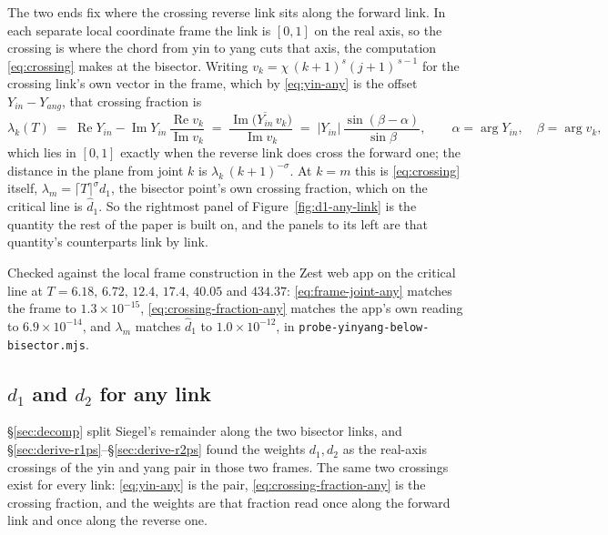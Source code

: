\documentclass[11pt]{article}
\theoremstyle{definition}
\begin{document}
The two ends fix where the crossing reverse link sits along the forward link. In each separate local coordinate frame the link
is $[0,1]$ on the real axis, so the crossing is where the chord from yin to
yang cuts that axis, the computation \eqref{eq:crossing} makes at the bisector.
Writing $v_k=\chi\,(k+1)^{s}(j+1)^{\,s-1}$ for the crossing link's own vector in
the frame, which by \eqref{eq:yin-any} is the offset $Y_{in}-Y_{ang}$, that
crossing fraction is
\begin{equation}\label{eq:crossing-fraction-any}
\lambda_k(T)
\;=\;\operatorname{Re}Y_{in}-\operatorname{Im}Y_{in}\,
\frac{\operatorname{Re}v_k}{\operatorname{Im}v_k}
\;=\;\frac{\operatorname{Im}\bigl(\overline{Y_{in}}\,v_k\bigr)}{\operatorname{Im}v_k}
\;=\;\bigl|Y_{in}\bigr|\,\frac{\sin(\beta-\alpha)}{\sin\beta},
\qquad
\alpha=\arg Y_{in},\quad \beta=\arg v_k,
\end{equation}
which lies in $[0,1]$ exactly when the reverse link does cross the forward one;
the distance in the plane from joint $k$ is $\lambda_k\,(k+1)^{-\sigma}$. At
$k=m$ this is \eqref{eq:crossing} itself, $\lambda_m=\lceil T\rceil^{\sigma}d_1$,
the bisector point's own crossing fraction, which on the critical line is
$\hat d_1$. So the rightmost panel of Figure~\ref{fig:d1-any-link} is the
quantity the rest of the paper is built on, and the panels to its left are that
quantity's counterparts link by link.

Checked against the local frame construction in the Zest web app on the critical
line at $T=6.18,\,6.72,\,12.4,\,17.4,\,40.05$ and $434.37$:
\eqref{eq:frame-joint-any} matches the frame to $1.3\times10^{-15}$,
\eqref{eq:crossing-fraction-any} matches the app's own reading to
$6.9\times10^{-14}$, and $\lambda_m$ matches $\hat d_1$ to $1.0\times10^{-12}$,
in \texttt{probe-yinyang-below-bisector.mjs}.

\subsection{\texorpdfstring{$d_1$ and $d_2$}{d1 and d2} for any link}\label{sec:d1-any}

\S\ref{sec:decomp} split Siegel's remainder along the two bisector links,
and \S\ref{sec:derive-r1ps}--\S\ref{sec:derive-r2ps} found the weights
$d_1,d_2$ as the real-axis crossings of the yin and yang pair in those two
frames. The same two crossings exist for every link: \eqref{eq:yin-any} is
the pair, \eqref{eq:crossing-fraction-any} is the crossing fraction, and the
weights are that fraction read once along the forward link and once along the
reverse one.
\end{document}
